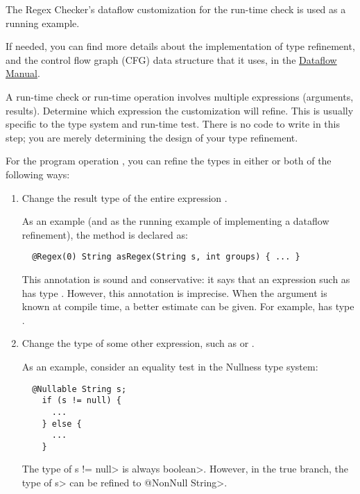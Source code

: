 The Regex Checker's dataflow customization for the
run-time check is used as a running example.

If needed, you can find more details about the implementation of
type refinement, and the control flow graph (CFG) data
structure that it uses, in the
\href{https://checkerframework.org/manual/checker-framework-dataflow-manual.pdf}{Dataflow
  Manual}.



A run-time check or run-time
operation involves multiple expressions (arguments, results).
Determine which expression the customization will refine.  This is
usually specific to the type system and run-time test.
There is no code to write in this step; you are merely determining
the design of your type refinement.

For the program operation , you can refine
the types in either or both of the following ways:
\begin{enumerate}
\item Change the result type of the entire expression .

As an example (and as the running example of implementing a dataflow
refinement), the  method is declared as:

\begin{smaller}
\begin{Verbatim}
  @Regex(0) String asRegex(String s, int groups) { ... }
\end{Verbatim}
\end{smaller}

\noindent
This annotation is sound and conservative:  it says that an expression such
as  has type .  However, this annotation is imprecise.  When the 
argument is known at compile time, a better estimate can be given.  For
example,  has type .

\item Change the type of some other expression, such as  or .

As an example, consider an equality test in the Nullness type system:

\begin{Verbatim}
  @Nullable String s;
    if (s != null) {
      ...
    } else {
      ...
    }
\end{Verbatim}

The type of \<s != null> is always \<boolean>.  However, in the
true branch, the type of \<s> can be refined to \<@NonNull String>.

\end{enumerate}

